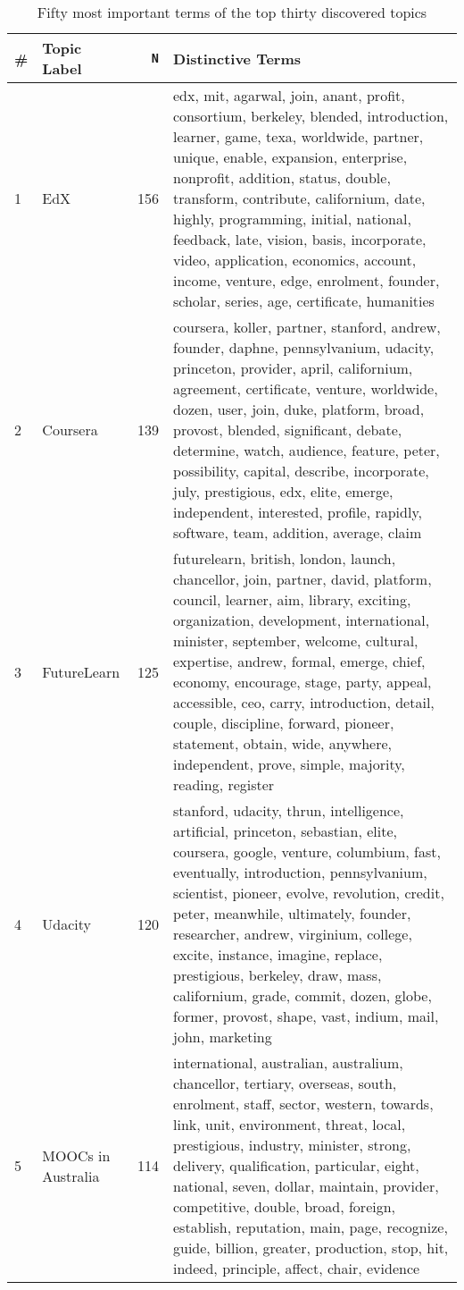 \begin{table}[ht]
\centering
\caption{Fifty most important terms of the top thirty discovered topics} 
\label{tab:topic_terms}
{\footnotesize
\begin{tabularx}{\textwidth}{llrX}
  \toprule
\# & Topic Label & \texttt{N} & Distinctive Terms \\ 
  \midrule
  1 & EdX & 156 & edx, mit, agarwal, join, anant, profit, consortium, berkeley, blended, introduction, learner, game, texa, worldwide, partner, unique, enable, expansion, enterprise, nonprofit, addition, status, double, transform, contribute, californium, date, highly, programming, initial, national, feedback, late, vision, basis, incorporate, video, application, economics, account, income, venture, edge, enrolment, founder, scholar, series, age, certificate, humanities \\ 
    2 & Coursera & 139 & coursera, koller, partner, stanford, andrew, founder, daphne, pennsylvanium, udacity, princeton, provider, april, californium, agreement, certificate, venture, worldwide, dozen, user, join, duke, platform, broad, provost, blended, significant, debate, determine, watch, audience, feature, peter, possibility, capital, describe, incorporate, july, prestigious, edx, elite, emerge, independent, interested, profile, rapidly, software, team, addition, average, claim \\ 
    3 & FutureLearn & 125 & futurelearn, british, london, launch, chancellor, join, partner, david, platform, council, learner, aim, library, exciting, organization, development, international, minister, september, welcome, cultural, expertise, andrew, formal, emerge, chief, economy, encourage, stage, party, appeal, accessible, ceo, carry, introduction, detail, couple, discipline, forward, pioneer, statement, obtain, wide, anywhere, independent, prove, simple, majority, reading, register \\ 
    4 & Udacity & 120 & stanford, udacity, thrun, intelligence, artificial, princeton, sebastian, elite, coursera, google, venture, columbium, fast, eventually, introduction, pennsylvanium, scientist, pioneer, evolve, revolution, credit, peter, meanwhile, ultimately, founder, researcher, andrew, virginium, college, excite, instance, imagine, replace, prestigious, berkeley, draw, mass, californium, grade, commit, dozen, globe, former, provost, shape, vast, indium, mail, john, marketing \\ 
    5 & MOOCs in Australia & 114 & international, australian, australium, chancellor, tertiary, overseas, south, enrolment, staff, sector, western, towards, link, unit, environment, threat, local, prestigious, industry, minister, strong, delivery, qualification, particular, eight, national, seven, dollar, maintain, provider, competitive, double, broad, foreign, establish, reputation, main, page, recognize, guide, billion, greater, production, stop, hit, indeed, principle, affect, chair, evidence \\ 

\end{tabularx}}
\end{table}
